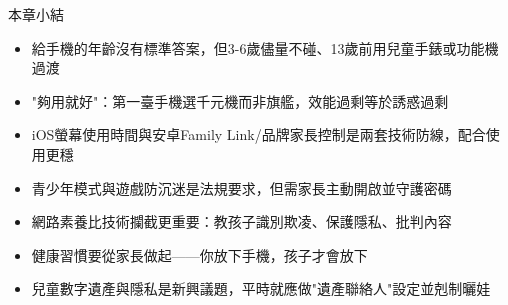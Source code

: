 \begin{tcbsummary}{本章小結}
\begin{itemize}
  \item 給手機的年齡沒有標準答案，但3-6歲儘量不碰、13歲前用兒童手錶或功能機過渡
  \item "夠用就好"：第一臺手機選千元機而非旗艦，效能過剩等於誘惑過剩
  \item iOS螢幕使用時間與安卓Family Link/品牌家長控制是兩套技術防線，配合使用更穩
  \item 青少年模式與遊戲防沉迷是法規要求，但需家長主動開啟並守護密碼
  \item 網路素養比技術攔截更重要：教孩子識別欺凌、保護隱私、批判內容
  \item 健康習慣要從家長做起——你放下手機，孩子才會放下
  \item 兒童數字遺產與隱私是新興議題，平時就應做"遺產聯絡人"設定並剋制曬娃
\end{itemize}

\end{tcbsummary}
